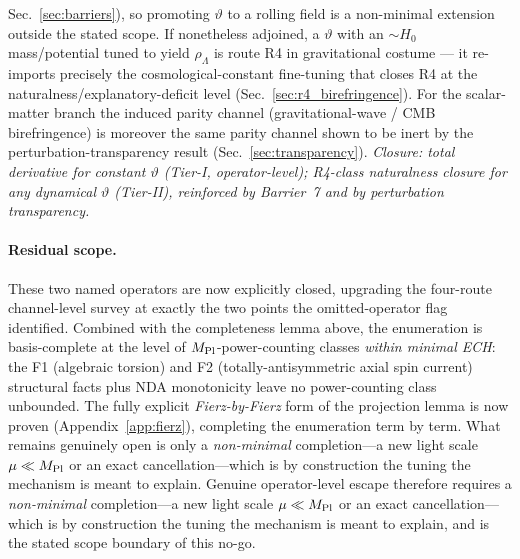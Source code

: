 \documentclass[aps,prd,twocolumn,superscriptaddress,showpacs,preprintnumbers,nofootinbib,longbibliography,floatfix]{revtex4-2}
\begin{document}
Sec.~\ref{sec:barriers}), so promoting $\vartheta$ to a rolling field is a
non-minimal extension outside the stated scope. If nonetheless adjoined, a
$\vartheta$ with an $\sim H_0$ mass/potential tuned to yield $\rho_\Lambda$ is
route R4 in gravitational costume --- it re-imports precisely the
cosmological-constant fine-tuning that closes R4 at the
naturalness/explanatory-deficit level (Sec.~\ref{sec:r4_birefringence}). For
the scalar-matter branch the induced parity channel (gravitational-wave / CMB
birefringence) is moreover the same parity channel shown to be inert by the
perturbation-transparency result (Sec.~\ref{sec:transparency}).
\emph{Closure: total derivative for constant $\vartheta$ (Tier-I, operator-level);
R4-class naturalness closure for any dynamical $\vartheta$ (Tier-II), reinforced
by Barrier~7 and by perturbation transparency.}

\paragraph{Residual scope.} These two named operators are now explicitly
closed, upgrading the four-route channel-level survey at exactly the two points
the omitted-operator flag identified. Combined with the completeness lemma
above, the enumeration is basis-complete at the level of $M_{\rm Pl}$-power-counting
classes \emph{within minimal ECH}: the F1 (algebraic torsion) and F2
(totally-antisymmetric axial spin current) structural facts plus NDA
monotonicity leave no power-counting class unbounded. The fully explicit
\emph{Fierz-by-Fierz} form of the projection lemma is now proven
(Appendix~\ref{app:fierz}), completing the enumeration term by term. What
remains genuinely open is only a \emph{non-minimal} completion---a new light
scale $\mu\ll M_{\rm Pl}$ or an exact cancellation---which is by construction the
tuning the mechanism is meant to explain. Genuine operator-level escape therefore requires a
\emph{non-minimal} completion---a new light scale $\mu\ll M_{\rm Pl}$ or an exact
cancellation---which is by construction the tuning the mechanism is meant to
explain, and is the stated scope boundary of this no-go.
\end{document}
